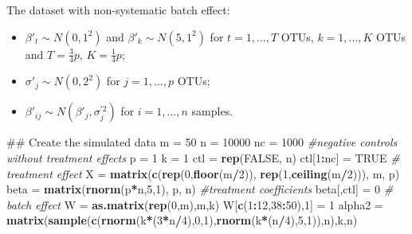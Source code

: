 \documentclass[]{book}
\newenvironment{Shaded}{\begin{snugshade}}{\end{snugshade}}
\newcommand{\KeywordTok}[1]{\textcolor[rgb]{0.13,0.29,0.53}{\textbf{#1}}}
\newcommand{\DecValTok}[1]{\textcolor[rgb]{0.00,0.00,0.81}{#1}}
\newcommand{\StringTok}[1]{\textcolor[rgb]{0.31,0.60,0.02}{#1}}
\newcommand{\CommentTok}[1]{\textcolor[rgb]{0.56,0.35,0.01}{\textit{#1}}}
\newcommand{\OtherTok}[1]{\textcolor[rgb]{0.56,0.35,0.01}{#1}}
\newcommand{\OperatorTok}[1]{\textcolor[rgb]{0.81,0.36,0.00}{\textbf{#1}}}
\newcommand{\NormalTok}[1]{#1}
\providecommand{\tightlist}{%
  \setlength{\itemsep}{0pt}\setlength{\parskip}{0pt}}
\begin{document}
The dataset with non-systematic batch effect:

\begin{itemize}
\tightlist
\item
  \(\beta'_{t} \sim N(0,1^{2})\) and \(\beta'_{k} \sim N(5,1^{2})\) for
  \(t=1,...,T\) OTUs, \(k=1,...,K\) OTUs and \(T=\frac{3}{4}p\),
  \(K=\frac{1}{4}p\);\\
\item
  \(\sigma'_{j} \sim N(0,2^{2})\) for \(j=1,...,p\) OTUs;\\
\item
  \(\beta'_{ij} \sim N(\beta'_{j}, \sigma_{j}^{'2})\) for
  \(i = 1,...,n\) samples.
\end{itemize}

\begin{Shaded}
\begin{Highlighting}[]
\NormalTok{## Create the simulated data}
\NormalTok{m =}\StringTok{ }\DecValTok{50}
\NormalTok{n =}\StringTok{ }\DecValTok{10000}
\NormalTok{nc =}\StringTok{ }\DecValTok{1000} \CommentTok{#negative controls without treatment effects}
\NormalTok{p =}\StringTok{ }\DecValTok{1}
\NormalTok{k =}\StringTok{ }\DecValTok{1}
\NormalTok{ctl =}\StringTok{ }\KeywordTok{rep}\NormalTok{(}\OtherTok{FALSE}\NormalTok{, n)}
\NormalTok{ctl[}\DecValTok{1}\OperatorTok{:}\NormalTok{nc] =}\StringTok{ }\OtherTok{TRUE}
\CommentTok{# treatment effect}
\NormalTok{X =}\StringTok{ }\KeywordTok{matrix}\NormalTok{(}\KeywordTok{c}\NormalTok{(}\KeywordTok{rep}\NormalTok{(}\DecValTok{0}\NormalTok{,}\KeywordTok{floor}\NormalTok{(m}\OperatorTok{/}\DecValTok{2}\NormalTok{)), }\KeywordTok{rep}\NormalTok{(}\DecValTok{1}\NormalTok{,}\KeywordTok{ceiling}\NormalTok{(m}\OperatorTok{/}\DecValTok{2}\NormalTok{))), m, p)}
\NormalTok{beta =}\StringTok{ }\KeywordTok{matrix}\NormalTok{(}\KeywordTok{rnorm}\NormalTok{(p}\OperatorTok{*}\NormalTok{n,}\DecValTok{5}\NormalTok{,}\DecValTok{1}\NormalTok{), p, n) }\CommentTok{#treatment coefficients}
\NormalTok{beta[,ctl] =}\StringTok{ }\DecValTok{0}
\CommentTok{# batch effect}
\NormalTok{W =}\StringTok{ }\KeywordTok{as.matrix}\NormalTok{(}\KeywordTok{rep}\NormalTok{(}\DecValTok{0}\NormalTok{,m),m,k)}
\NormalTok{W[}\KeywordTok{c}\NormalTok{(}\DecValTok{1}\OperatorTok{:}\DecValTok{12}\NormalTok{,}\DecValTok{38}\OperatorTok{:}\DecValTok{50}\NormalTok{),}\DecValTok{1}\NormalTok{] =}\StringTok{  }\DecValTok{1}
\NormalTok{alpha2 =}\StringTok{ }\KeywordTok{matrix}\NormalTok{(}\KeywordTok{sample}\NormalTok{(}\KeywordTok{c}\NormalTok{(}\KeywordTok{rnorm}\NormalTok{(k}\OperatorTok{*}\NormalTok{(}\DecValTok{3}\OperatorTok{*}\NormalTok{n}\OperatorTok{/}\DecValTok{4}\NormalTok{),}\DecValTok{0}\NormalTok{,}\DecValTok{1}\NormalTok{),}\KeywordTok{rnorm}\NormalTok{(k}\OperatorTok{*}\NormalTok{(n}\OperatorTok{/}\DecValTok{4}\NormalTok{),}\DecValTok{5}\NormalTok{,}\DecValTok{1}\NormalTok{)),n),k,n)}

\end{Highlighting}
\end{Shaded}
\end{document}
